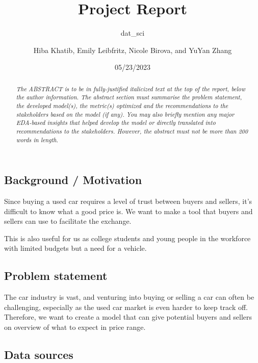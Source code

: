 \documentclass[
  letterpaper,
  DIV=11,
  numbers=noendperiod]{scrartcl}
\title{Project Report}
\subtitle{dat\_sci}
\author{Hiba Khatib, Emily Leibfritz, Nicole Birova, and YuYan Zhang}
\date{05/23/2023}
\begin{document}
\maketitle
\begin{abstract}
\emph{The ABSTRACT is to be in fully-justified italicized text at the
top of the report, below the author information. The abstract section
must summarise the problem statement, the developed model(s), the
metric(s) optimized and the recommendations to the stakeholders based on
the model (if any). You may also briefly mention any major EDA-based
insights that helped develop the model or directly translated into
recommendations to the stakeholders. However, the abstract must not be
more than 200 words in length}.
\end{abstract}
\ifdefined\Shaded\renewenvironment{Shaded}{\begin{tcolorbox}[frame hidden, boxrule=0pt, interior hidden, breakable, borderline west={3pt}{0pt}{shadecolor}, sharp corners, enhanced]}{\end{tcolorbox}}\fi

\hypertarget{background-motivation}{%
\subsection{Background / Motivation}\label{background-motivation}}

Since buying a used car requires a level of trust between buyers and
sellers, it's difficult to know what a good price is. We want to make a
tool that buyers and sellers can use to facilitate the exchange.

This is also useful for us as college students and young people in the
workforce with limited budgets but a need for a vehicle.

\hypertarget{problem-statement}{%
\subsection{Problem statement}\label{problem-statement}}

The car industry is vast, and venturing into buying or selling a car can
often be challenging, especially as the used car market is even harder
to keep track off. Therefore, we want to create a model that can give
potential buyers and sellers on overview of what to expect in price
range.

\hypertarget{data-sources}{%
\subsection{Data sources}\label{data-sources}}
\end{document}
